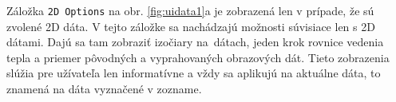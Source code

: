 \documentclass[a4paper,11pt,oneside]{article}%
\begin{document}
\begin{figure}[H]%
    \begin{center} 
    \qquad
    \caption{}%
    \label{fig:uidata}%
     \end{center} 
\end{figure}

Záložka \texttt{2D Options} na obr. \ref{fig:uidata1}a je zobrazená len v prípade, že sú zvolené 2D dáta. V tejto záložke sa nachádzajú možnosti súvisiace len s 2D dátami. Dajú sa tam zobraziť izočiary na~dátach, jeden krok rovnice vedenia tepla a priemer pôvodných a vyprahovaných obrazových dát. Tieto zobrazenia slúžia pre užívateľa len informatívne a vždy sa aplikujú na aktuálne dáta, to znamená na dáta vyznačené v zozname.
\end{document}
